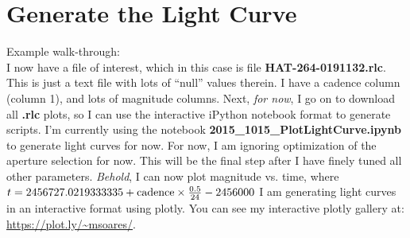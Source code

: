 \documentclass[11pt,letterpaper]{book} %
\begin{document}
\section*{Generate the Light Curve}
Example walk-through:\\
I now have a file of interest, which in this case is file \textbf{HAT-264-0191132.rlc}. This is just a text file with lots of ``null'' values therein. 
I have a cadence column (column 1), and lots of magnitude columns. 
Next, \textit{for now},  I go on to download all \textbf{.rlc} plots, so I can use the interactive iPython notebook format to generate scripts. 
I'm currently using the notebook \textbf{2015\_1015\_PlotLightCurve.ipynb} to generate light curves for now. 
For now, I am ignoring optimization of the aperture selection for now. This will be the final step after I have finely tuned all other parameters.
\textit{Behold}, I can now plot magnitude vs. time, where $t \rm = 2456727.0219333335+cadence \times \frac{0.5}{24}- 2456000$ 
I am generating light curves in an interactive format using plotly. You can see my interactive plotly gallery at:\\
\url{https://plot.ly/~msoares/}.
\end{document}
